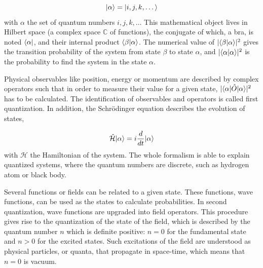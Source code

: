 \begin{equation}
  \label{eq:DiracNot}
  | \alpha\rangle=| i,j,k,\dots\rangle
\end{equation}with $\alpha$ the set of quantum numbers $i,j,k,\dots$ This mathematical object lives in Hilbert space (a complex space $\mathds{C}$ of functions), the conjugate of which, a bra, is noted $\langle \alpha |$, and their internal product $\langle \beta | \alpha\rangle$. The numerical value of $|\langle \beta | \alpha\rangle|^{2}$ gives the transition probability of the system from state $\beta$ to state $\alpha$, and $|\langle \alpha | \alpha\rangle|^{2}$ is the probability to find the system in the state $\alpha$.

Physical observables like position, energy or momentum are described by complex operators such that in order to measure their value for a given state, $|\langle \alpha |\hat{O}| \alpha\rangle|^{2}$ has to be calculated. The identification of observables and operators is called first quantization. In addition, the Schr\"{o}dinger equation describes the evolution of states,

\begin{equation}
  \label{eq:Schrodinger}
  \hat{\mathcal{H}}| \alpha\rangle=i\frac{d}{dt}| \alpha\rangle
\end{equation}with $\mathcal{H}$ the Hamiltonian of the system. The whole formalism is able to explain quantized systems, where the quantum numbers are discrete, such as hydrogen atom or black body.

Several functions or fields can be related to a given state. These functions, wave functions, can be used as the states to calculate probabilities. In second quantization, wave functions are upgraded into field operators. This procedure gives rise to the quantization of the state of the field, which is described by the quantum number $n$ which is definite positive: $n=0$ for the fundamental state and $n>0$ for the excited states. Such excitations of the field are understood as physical particles, or quanta, that propagate in space-time, which means that $n=0$ is vacuum. 


